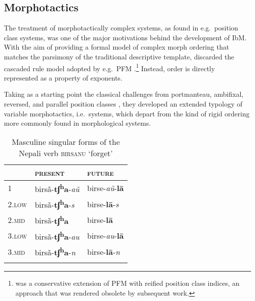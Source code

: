 \documentclass[output=paper
 	        ,biblatex
                ,babelshorthands
                ,newtxmath
                ,draftmode
                ,colorlinks, citecolor=brown
]{langscibook}
\begin{document}
\begin{exe}
\begin{xlist}
\begin{exe}
\begin{xlist}
\subsection{Morphotactics}
\label{sec:Mortax}

The treatment of morphotactically complex systems, as found in e.g.\
position class systems, was one of the major motivations behind the
development of IbM. With the aim of providing a formal model of
complex morph ordering that matches the parsimony of the traditional
descriptive template, \citet{Crysmann:Bonami:2016} discarded the
cascaded rule model adopted by e.g.\ PFM
\citep{Stump01}.\footnote{\citet{Crysmann12} was a conservative
  extension of PFM with reified position class indices, an approach
  that was rendered obsolete by subsequent work.} Instead, order is
directly represented as a property of exponents.

Taking as a starting point the classical challenges from
\citet{Stump93} \emdash portmanteau, ambifixal, reversed, and parallel
position classes \emdash, they developed an extended typology of variable
morphotactics, i.e.\ systems, which depart from the kind of rigid
ordering more commonly found in morphological systems.

\begin{table}[ht!]
\centering
    \begin{tabular}{lll}
      \lsptoprule
      & \textsc{present} & \textsc{future}\\
      \midrule
      1 & birsã-\textbf{tʃ\textsuperscript{h}a}-\emph{aũ} & 
                                                                birse-\emph{aũ}-\textbf{lā}\\
      \textsc{2.low} &
                 birsã-\textbf{tʃ\textsuperscript{h}a}-\emph{s} & 
                                                                      birse-\textbf{lā}-\emph{s}\\
      \textsc{2.mid} & 
                  birsã-\textbf{tʃ\textsuperscript{h}a} & 
                                                         birse-\textbf{lā}\\
      \textsc{3.low} & 
                  birsã-\textbf{tʃ\textsuperscript{h}a}-\emph{au} & 
                                                                        birse-\emph{au}-\textbf{lā}\\
      \textsc{3.mid} &
                 birsã-\textbf{tʃ\textsuperscript{h}a}-\emph{n} & 
                                                                      birse-\textbf{lā}-\emph{n}\\
      \lspbottomrule
    \end{tabular}
\caption{Masculine singular forms of the Nepali verb \textsc{birsanu} `forget'}
\label{tab:Nepali}
\end{table}


\end{xlist}
\end{exe}
\end{xlist}
\end{exe}
\end{document}
